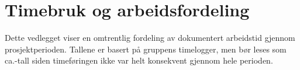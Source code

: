 \chapter{Timebruk og arbeidsfordeling}
\label{app:timelog}

Dette vedlegget viser en omtrentlig fordeling av dokumentert arbeidstid gjennom
prosjektperioden. Tallene er basert på gruppens timelogger, men bør leses som
ca.-tall siden timeføringen ikke var helt konsekvent gjennom hele perioden.

